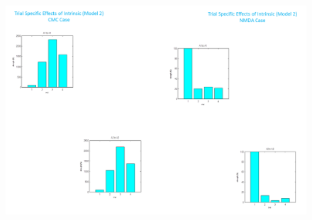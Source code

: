 \begin{figure}
\begin{center}
\includegraphics[width=140mm]{dcm_csd/dcm_csd_fig4}
\caption{\em  \label{dcm_ssr:fig4}}
\end{center}
\end{figure}
